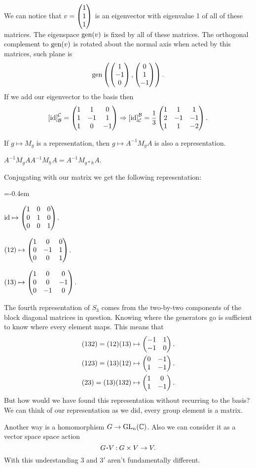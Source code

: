 \documentclass[12pt]{memoir}
\begin{document}
We can notice that $v=\begin{pmatrix} 1 \\ 1 \\ 1 \end{pmatrix}$ is an eigenvector with eigenvalue 1 of all of these matrices. The eigenspace $\operatorname{gen}(v)$ is fixed by all of these matrices. The orthogonal complement to $\operatorname{gen}(v)$ is rotated about the normal axis when acted by this matrices, such plane is 
$$\operatorname{gen}\left(\begin{pmatrix} 1 \\ -1 \\ 0 \end{pmatrix},\begin{pmatrix} 0 \\ 1 \\ -1 \end{pmatrix}\right).$$
If we add our eigenvector to the basis then 
$$\left\lbrack\operatorname{id}\right\rbrack_{\mathcal{B}}^{\mathcal{C}}=\begin{pmatrix} 1 & 1 & 0 \\ 1 & -1 & 1 \\ 1 & 0 & -1 \end{pmatrix}\Rightarrow\left\lbrack\operatorname{id}\right\rbrack^{\mathcal{B}}_{\mathcal{C}}=\frac{1}{3}\begin{pmatrix} 1 & 1 & 1 \\ 2 & -1 & -1 \\ 1 & 1 & -2 \end{pmatrix}.$$

\begin{Lem}
    If $g\mapsto M_g$ is a representation, then $g\mapsto A^{-1}M_gA$ is also a representation.
\end{Lem}

\begin{ptcbp}
    $A^{-1}M_gAA^{-1}M_hA=A^{-1}M_{g\ast h}A$. 
\end{ptcbp}

Conjugating with our matrix we get the following representation:
\begin{itemize}\begin{multicols}{3}
    \itemsep=-0.4em
\item $\operatorname{id}\mapsto \begin{pmatrix} 1 & 0 & 0 \\ 0 & 1 & 0 \\ 0 & 0 & 1 \end{pmatrix}$.     
\item $(12)\mapsto \begin{pmatrix} 1 & 0 & 0 \\ 0 & -1 & 1 \\ 0 & 0 & 1 \end{pmatrix}$.       
\item $(13)\mapsto \begin{pmatrix} 1 & 0 & 0 \\ 0 & 0 & -1 \\ 0 & -1 & 0 \end{pmatrix}$.              
\end{multicols}
\end{itemize}

The fourth representation of $S_3$ comes from the two-by-two components of the block diagonal matrices in question. Knowing where the generators go is sufficient to know where every element maps. This means that 
\begin{align*}
    &(132)=(12)(13)\mapsto\begin{pmatrix} -1 & 1 \\ -1 & 0 \end{pmatrix}.\\
    &(123)=(13)(12)\mapsto\begin{pmatrix} 0 & -1 \\ 1 & -1 \end{pmatrix}.\\
    &(23)=(13)(132)\mapsto\begin{pmatrix} 1 & 0 \\ 1 & -1 \end{pmatrix}.
\end{align*}
But how would we have found this representation without recurring to the basis? We can think of our representation as we did, every group element is a matrix.\par 
Another way is a homomorphism $G\to\operatorname{GL}_n(\mathbb{C})$. Also we can consider it as a vector space space action 
$$G\.V\: G\x V\to V.$$
With this understanding $3$ and $3'$ aren't fundamentally different.
\end{document}
